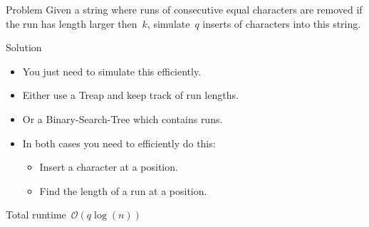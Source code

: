 \begin{slide}
	\begin{block}{Problem}
		Given a string where runs of consecutive equal characters are removed if the run has length larger then~$k$, simulate~$q$ inserts of characters into this string.
	\end{block}
	\pause
	\begin{block}{Solution}
		\begin{itemize}
			\item You just need to simulate this efficiently.
			\item Either use a Treap and keep track of run lengths.
			\item Or a Binary-Search-Tree which contains runs.
			\item In both cases you need to efficiently do this:
			\begin{itemize}
				\item Insert a character at a position.
				\item Find the length of a run at a position.
			\end{itemize}
		\end{itemize}
		Total runtime~$\mathcal{O}(q\log(n))$
	\end{block}
\end{slide}
